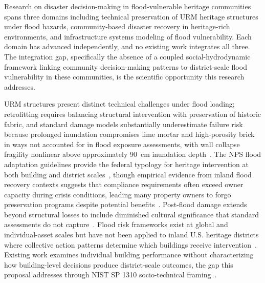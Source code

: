 \documentclass[11pt]{article}
\begin{document}
Research on disaster decision-making in flood-vulnerable heritage communities spans three domains
including technical preservation of URM heritage structures under flood hazards,
community-based disaster recovery in heritage-rich environments, and infrastructure
systems modeling of flood vulnerability.
Each domain has advanced independently, and no existing work integrates all three.
The integration gap, specifically the absence of a coupled social-hydrodynamic framework
linking community decision-making patterns to district-scale flood vulnerability in
these communities, is the scientific opportunity this research addresses.

URM structures present distinct technical challenges under flood loading;
retrofitting requires balancing structural intervention with preservation of historic
fabric, and standard damage models substantially underestimate failure risk because
prolonged inundation compromises lime mortar and high-porosity brick in ways not
accounted for in flood exposure assessments, with wall collapse fragility nonlinear
above approximately 90~cm inundation
depth~\cite{SeronSuhoothi2017,xiao2021flood,castillo2026moisture,korswagen2025experimental,moaiyedfar2025collapse}.
The NPS flood adaptation guidelines provide the federal typology for heritage
intervention at both building and district scales~\cite{NPS2021}, though empirical
evidence from inland flood recovery contexts suggests that compliance requirements
often exceed owner capacity during crisis conditions, leading many property owners
to forgo preservation programs despite potential
benefits~\cite{maalouf2025b,GAO2025,Poling2024}.
Post-flood damage extends beyond structural losses to include diminished cultural
significance that standard assessments do not
capture~\cite{Arrighi2024,sesana2021climate}.
Flood risk frameworks exist at global and individual-asset scales but have not been
applied to inland U.S. heritage districts where collective action patterns determine
which buildings receive intervention~\cite{carmichael2023riverine,figueiredo2024flovri,vojinovic2016holistic}.
Existing work examines individual building performance without characterizing how
building-level decisions produce district-scale outcomes, the gap this proposal
addresses through NIST SP 1310 socio-technical framing~\cite{NIST2024SP1310}.
\end{document}
